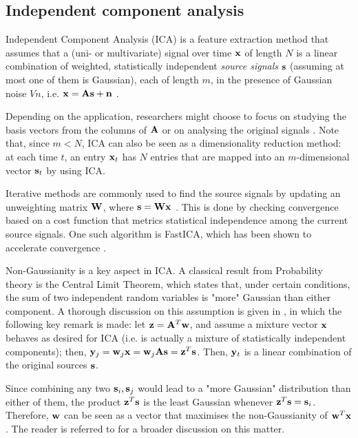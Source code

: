\documentclass[../main.tex]{subfiles}
\begin{document}
\subsection{Independent component analysis} \label{subsection_ica}
Independent Component Analysis (ICA) is a feature extraction method that assumes that a (uni- or multivariate) signal over time $\mathbf{x}$ of length $N$ is a linear combination of weighted, statistically independent \emph{source signals} $\mathbf{s}$ (assuming at most one of them is Gaussian), each of length $m$, in the presence of Gaussian noise $V{n}$, i.e. $\mathbf{x} = \mathbf{As} + \mathbf{n}$ \cite{Kasprzak}.
\par Depending on the application, researchers might choose to focus on studying the basis vectors from the columns of $\mathbf{A}$ or on analysing the original signals \cite{Kasprzak,Hsieh2009,Chien2006,Jang2001}. Note that, since $m<N$, ICA can also be seen as a dimensionality reduction method: at each time $t$, an entry $\mathbf{x}_t$ has $N$ entries that are mapped into an $m$-dimensional vector $\mathbf{s}_t$ by using ICA. 
\par Iterative methods are commonly used to find the source signals by updating an unweighting matrix $\mathbf{W}$, where $\mathbf{s} = \mathbf{Wx}$ \cite{Hyvarinen2000}. This is done by checking convergence based on a cost function that metrics statistical independence among the current source signals. One such algorithm is FastICA, which has been shown to accelerate convergence \cite{Hyvarinen2000, Kasprzak}. 
\par Non-Gaussianity is a key aspect in ICA. A classical result from Probability theory is the Central Limit Theorem, which states that, under certain conditions, the sum of two independent random variables is "more" Gaussian than either component. A thorough discussion on this assumption is given in \cite{Hyvarinen2000}, in which the following key remark is made: let $\mathbf{z} = \mathbf{A}^T\mathbf{w}$, and assume a mixture vector $\mathbf{x}$ behaves as desired for ICA (i.e. is actually a mixture of statistically independent components); then, $\mathbf{y}_j = \mathbf{w}_j\mathbf{x} = \mathbf{w}_j\mathbf{As} = \mathbf{z}^T\mathbf{s}$. Then, $\mathbf{y}_t$ is a linear combination of the original sources $\mathbf{s}$. 
\par Since combining any two $\mathbf{s}_i, \mathbf{s}_j$ would lead to a "more Gaussian" distribution than either of them, the product $\mathbf{z}^T\mathbf{s}$ is the least Gaussian whenever $\mathbf{z}^T\mathbf{s} = \mathbf{s}_i$. Therefore, $\mathbf{w}$ can be seen as a vector that maximises the non-Gaussianity of $\mathbf{w}^T\mathbf{x}$. The reader is referred to \cite{Hyvarinen2000} for a broader discussion on this matter.
\end{document}
